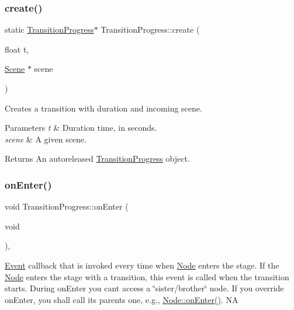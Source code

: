 \subsubsection{\texorpdfstring{create()}{create()}\hspace{0.1cm}{\footnotesize\ttfamily [2/2]}}
{\footnotesize\ttfamily static \hyperlink{classTransitionProgress}{Transition\+Progress}$\ast$ Transition\+Progress\+::create (\begin{DoxyParamCaption}\item[{float}]{t,  }\item[{\hyperlink{classScene}{Scene} $\ast$}]{scene }\end{DoxyParamCaption})\hspace{0.3cm}{\ttfamily [static]}}

Creates a transition with duration and incoming scene.


\begin{DoxyParams}{Parameters}
{\em t} & Duration time, in seconds. \\
\hline
{\em scene} & A given scene. \\
\hline
\end{DoxyParams}
\begin{DoxyReturn}{Returns}
An autoreleased \hyperlink{classTransitionProgress}{Transition\+Progress} object. 
\end{DoxyReturn}
\mbox{\label{classTransitionProgress_a4bb6172fb74abe0a0a0de2a3742a9cf6}} 
\subsubsection{\texorpdfstring{on\+Enter()}{onEnter()}\hspace{0.1cm}{\footnotesize\ttfamily [1/2]}}
{\footnotesize\ttfamily void Transition\+Progress\+::on\+Enter (\begin{DoxyParamCaption}\item[{void}]{ }\end{DoxyParamCaption})\hspace{0.3cm}{\ttfamily [override]}, {\ttfamily [virtual]}}

\hyperlink{classEvent}{Event} callback that is invoked every time when \hyperlink{classNode}{Node} enters the \textquotesingle{}stage\textquotesingle{}. If the \hyperlink{classNode}{Node} enters the \textquotesingle{}stage\textquotesingle{} with a transition, this event is called when the transition starts. During on\+Enter you can\textquotesingle{}t access a \char`\"{}sister/brother\char`\"{} node. If you override on\+Enter, you shall call its parent\textquotesingle{}s one, e.\+g., \hyperlink{classNode_a7f51764c4afd5018a052b9ef71c03374}{Node\+::on\+Enter()}.  NA 

